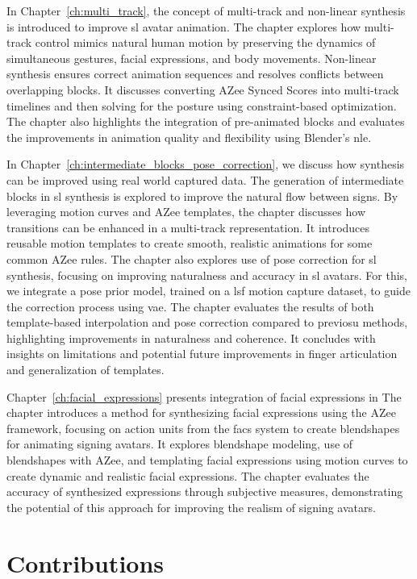 \documentclass[../../main.tex]{subfiles}
\begin{document}
In Chapter~\ref{ch:multi_track}, the concept of multi-track and non-linear synthesis is introduced to improve \gls{sl} avatar animation. The chapter explores how multi-track control mimics natural human motion by preserving the dynamics of simultaneous gestures, facial expressions, and body movements. Non-linear synthesis ensures correct animation sequences and resolves conflicts between overlapping blocks. It discusses converting AZee Synced Scores into multi-track timelines and then solving for the posture using constraint-based  optimization. The chapter also highlights the integration of pre-animated blocks and evaluates the improvements in animation quality and flexibility using Blender's \gls{nle}.

In Chapter~\ref{ch:intermediate_blocks_pose_correction}, we discuss how synthesis can be improved using real world captured data. The generation of intermediate blocks in \gls{sl} synthesis is explored to improve the natural flow between signs. By leveraging motion curves and AZee templates, the chapter discusses how transitions can be enhanced in a multi-track representation. It introduces reusable motion templates to create smooth, realistic animations for some common AZee rules. The chapter also explores use of pose correction for \gls{sl} synthesis, focusing on improving naturalness and accuracy in \gls{sl} avatars. For this, we integrate a pose prior model, trained on a \gls{lsf} motion capture dataset, to guide the correction process using \gls{vae}. The chapter evaluates the results of both template-based interpolation and pose correction compared to previosu methods, highlighting improvements in naturalness and coherence. It concludes with insights on limitations and potential future improvements in finger articulation and generalization of templates. 

Chapter~\ref{ch:facial_expressions} presents integration of facial expressions in The chapter introduces a method for synthesizing facial expressions using the AZee framework, focusing on action units from the \gls{facs} system to create blendshapes for animating signing avatars. It explores blendshape modeling, use of blendshapes with AZee, and templating facial expressions using motion curves to create dynamic and realistic facial expressions. The chapter evaluates the accuracy of synthesized expressions through subjective measures, demonstrating the potential of this approach for improving the realism of signing avatars.

\section{Contributions}
\label{ch:conclusion:contributions}
\end{document}

